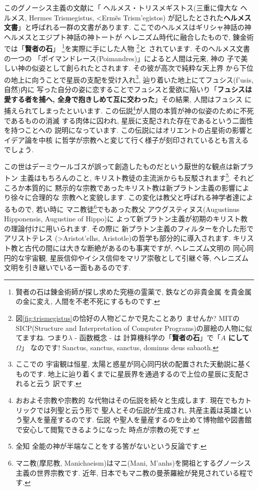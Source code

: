 \documentclass[b5j,8pt,twocolumn]{ltjsarticle}
\newcommand{\textgreek}[1]{\begingroup\fontencoding{LGR}\selectfont#1\endgroup}
\begin{document}
このグノーシス主義の文献に「 ヘルメス・トリスメギストス(三重に偉大な
ヘルメス, Hermes Trismegistus, \textgreek{<Erm\~es Trism'egistos})
が記したとされた\textbf{ヘルメス文書}」と呼ばれる一群の文書があります.
 ここでのヘルメスはギリシャ神話の神ヘルメスとエジプト神話の神トートが
ヘレニズム時代に融合したもので, 錬金術では「\textbf{賢者の石}」
\footnote{賢者の石は錬金術師が探し求めた究極の霊薬で, 鉄などの非貴金属
を貴金属の金に変え, 人間を不老不死にするものです.}を実際に手にした人物
\footnote{図\ref{fig:trismegistus}の恰好の人物どこかで見たことあり
ませんか? MITのSICP(Structure and Interpretation of Computer
 Programs)の扉絵の人物に似てますね. つまり$\lambda$ - 函数概念 - は
計算機科学の「\textbf{賢者の石}」で「\textbf{$A$ にして $\Omega$}」
なのです! Sanctus, sanctus, sanctus, dominus deus sabaoth.}と
されています\cite{錬金術}. そのヘルメス文書の一つの
「ポイマンドレース(Poimandres)」\cite{柴田}によると人間は元来, 神の
子で美しい神の似姿として創られたとされます. その彼が高次で純粋な天上界
から下位の地上に向うことで星辰の支配を受け入れ\footnote{ここでの
宇宙観は恒星, 太陽と惑星が同心同円状の配置された天動説に基くものです.
 地上に辿り着くまでに星辰界を通過するので上位の星辰に支配されると云う
訳です.}, 辿り着いた地上にてフュシス(\textgreek{f'usis}, 自然)内に
写った自分の姿に恋することでフュシスと愛欲に陥いり「\textbf{フュシスは
愛する者を捕へ, 全身で抱きしめて互に交わった}」その結果, 人間はフュシス
に捕えられてしまったといいます. この伝説\footnote{おおよそ宗教や宗教的
な代物はその伝説を続々と生成します. 現在でもカトリックでは列聖と云う形で
聖人とその伝説が生成され, 共産主義は英雄という聖人を量産するのです. 伝説
や聖人を量産するのを止めて博物館や図書館で安心して閲覧できるようになった
時点が宗教の死です.}が人間の本質が神の似姿のために不死であるものの消滅
する肉体に囚われ, 星辰に支配された存在であるという二面性を持つことへの
説明になっています. この伝説にはオリエントの占星術の影響とイデア論を中核
に哲学が宗教へと変じて行く様子が刻印されているとも言えるでしょう.
\newline

この世はデーミウールゴスが誤って創造したものだという厭世的な観点は新プラトン
主義はもちろんのこと, キリスト教徒の主流派からも反駁されます\footnote{全知
全能の神が半端なことをする筈がないという反論です.}. それどころか本質的に
黙示的な宗教であったキリスト教は新プラトン主義の影響により徐々に合理的な
宗教へと変貌します. この変化は教父と呼ばれる神学者達によるもので, 若い時に
マニ教徒\footnote{マニ教(摩尼教, Manichaeism)はマニ(Mani,
 \textgreek{M'anhs})を開祖とするグノーシス主義の世界宗教です. 近年,
 日本でもマニ教の曼荼羅絵が発見されている程です.}でもあった教父
 アウグスティヌス(Augustinus Hipponensis, Augustine of Hippo)に
よって新プラトン主義が初期のキリスト教の理論付けに用いられます. その際に
新プラトン主義のフィルターを介した形でアリストテレス
(\textgreek{>Aristot'elhs}, Aristotle)の哲学も部分的に導入されます.
 キリスト教と古代の間には大きな断絶があるのも事実ですが, ヘレニズム文明の
同心同円的な宇宙観, 星辰信仰やイシス信仰をマリア崇敬として引継ぐ等,
 ヘレニズム文明を引き継いでいる一面もあるのです.
\newline
\end{document}
